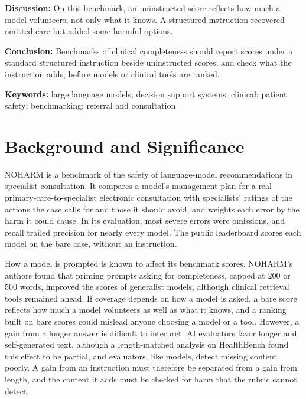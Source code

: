 \documentclass[11pt]{article}
\begin{document}
\noindent\textbf{Discussion:} On this benchmark, an uninstructed score reflects how much a model
volunteers, not only what it knows. A structured instruction recovered omitted care but added some harmful options.

\noindent\textbf{Conclusion:} Benchmarks of clinical completeness should report scores under a
standard structured instruction beside uninstructed scores, and check what the instruction adds,
before models or clinical tools are ranked.

\noindent\textbf{Keywords:} large language models; decision support systems, clinical;
patient safety; benchmarking; referral and consultation

\section*{Background and Significance}
\label{sec:intro}
\label{sec:related}
NOHARM is a benchmark of the safety of language-model recommendations in specialist
consultation.\citep{wu2025noharm} It compares a model's management plan for a real
primary-care-to-specialist electronic consultation with specialists' ratings of the actions the
case calls for and those it should avoid, and weights each error by the harm it could cause. In its
evaluation, most severe errors were omissions, and recall trailed precision for nearly every model.
The public leaderboard scores each model on the bare case, without an instruction.

How a model is prompted is known to affect its benchmark
scores.\citep{nori2023medprompt,ceballos2024open,sclar2024quantifying,mizrahi2024state,polo2024efficient}
NOHARM's authors found that priming prompts asking for completeness, capped at 200 or 500 words,
improved the scores of generalist models, although clinical retrieval tools remained
ahead.\citep{wu2025noharm} If coverage depends on how a model is asked, a bare score reflects how
much a model volunteers as well as what it knows, and a ranking built on bare scores could mislead
anyone choosing a model or a tool. However, a gain from a longer answer is difficult to interpret.
AI evaluators favor longer and self-generated
text,\citep{zheng2023judging,saito2023verbosity,dubois2024length,panickssery2024recognize,wataoka2024selfpreference}
although a length-matched analysis on HealthBench found this effect to be
partial,\citep{arora2025healthbench} and evaluators, like models, detect missing content
poorly.\citep{fox2026omission,absencebench2025} A gain from an instruction must therefore be
separated from a gain from length, and the content it adds must be checked for harm that the
rubric cannot detect.
\end{document}
